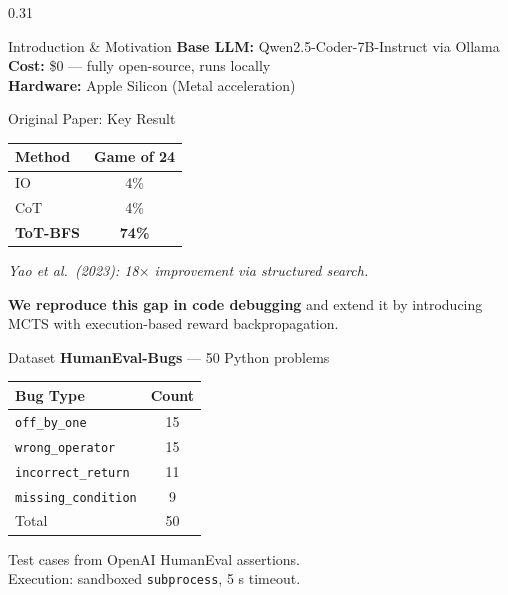 \documentclass[final]{beamer}
\begin{document}
\begin{frame}[t]{}
\begin{columns}[t,totalwidth=\textwidth]
\begin{column}{0.31\textwidth}
\begin{block}{Introduction \& Motivation}
\textbf{Base LLM:} Qwen2.5-Coder-7B-Instruct via Ollama\\
\textbf{Cost:} \$0 --- fully open-source, runs locally\\
\textbf{Hardware:} Apple Silicon (Metal acceleration)
\end{block}

\vspace{0.6cm}

\begin{block}{Original Paper: Key Result}
\centering
\begin{tabular}{@{} l c @{}}
\toprule
\textbf{Method} & \textbf{Game of 24} \\
\midrule
IO               & 4\%  \\
CoT              & 4\%  \\
\textbf{ToT-BFS} & \textbf{74\%} \\
\bottomrule
\end{tabular}
\vspace{0.4cm}

\raggedright
\textit{Yao et al.\ (2023): 18$\times$ improvement via structured search.}
\vspace{0.4cm}

\textbf{We reproduce this gap in code debugging} and extend it by introducing MCTS with execution-based reward backpropagation.
\end{block}

\vspace{0.6cm}

\begin{block}{Dataset}
\textbf{HumanEval-Bugs} --- 50 Python problems

\vspace{0.4cm}
\begin{tabular}{@{} l c @{}}
\toprule
\textbf{Bug Type} & \textbf{Count} \\
\midrule
\texttt{off\_by\_one}       & 15 \\
\texttt{wrong\_operator}    & 15 \\
\texttt{incorrect\_return}  & 11 \\
\texttt{missing\_condition} &  9 \\
\midrule
Total                        & 50 \\
\bottomrule
\end{tabular}
\vspace{0.4cm}

Test cases from OpenAI HumanEval assertions.\\
Execution: sandboxed \texttt{subprocess}, 5 s timeout.
\end{block}


\end{column}
\end{columns}
\end{frame}
\end{document}
